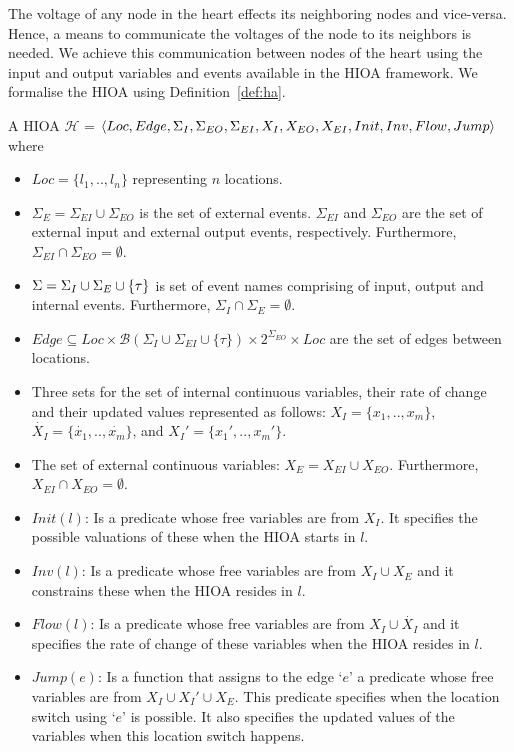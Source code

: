 The voltage of any node in the heart effects its neighboring nodes and
vice-versa. Hence, a means to communicate the voltages of the node to
its neighbors is needed. We achieve this communication between nodes of
the heart using the input and output variables and events available in
the \ac{HIOA} framework. We formalise the \ac{HIOA} using
Definition~\ref{def:ha}.


\begin{definition}
  A \acf{HIOA} \newline $\mathcal{H}$ =
  $\langle Loc, Edge, \Sigma_I, \Sigma_{EO}, \Sigma_{EI}, X_I, X_{EO},
  X_{EI}, \linebreak Init, Inv, Flow, Jump\rangle$ where
  \begin{itemize}
  \item $Loc=\{l_1,..,l_n\}$ representing $n$ locations.
  \item $\Sigma_{E} = \Sigma_{EI} \cup \Sigma_{EO}$ is the set of
    external events. $\Sigma_{EI}$ and $\Sigma_{EO}$ are the set of
    external input and external output events,
    respectively. Furthermore,
    \mbox{$\Sigma_{EI} \cap \Sigma_{EO} = \emptyset$}.
  \item $\Sigma=\Sigma_I \cup \Sigma_{E} \cup \{\tau\}$ is set of
    event names comprising of input, output and internal
    events. Furthermore, \mbox{$\Sigma_I \cap \Sigma_E = \emptyset$}.
  \item
    $Edge \subseteq Loc \times \mathcal{B}(\Sigma_I \cup \Sigma_{EI}
    \cup \{\tau\}) \times 2^{\Sigma_{EO}} \times Loc$
    are the set of edges between locations.
  \item Three sets for the set of internal continuous variables, their
    rate of change and their updated values represented as follows:
    $X_I=\{x_1,.., x_m\}$, $\dot{X_I}=\{\dot{x_1},.., \dot{x_m}\}$, and
    $X_I'=\{x_{1}',.., x_{m}'\}$.
  \item The set of external continuous variables:
    \mbox{$X_E = X_{EI} \cup X_{EO}$}. Furthermore,
    \mbox{$X_{EI} \cap X_{EO} = \emptyset$}.
  \item $Init(l)$: Is a predicate whose free variables are from
    $X_{I}$. It specifies the possible valuations of these when the HIOA
    starts in $l$.
  \item $Inv(l)$: Is a predicate whose free variables are from
    \mbox{$X_I \cup X_{E}$} and it constrains these when the HIOA
    resides in $l$.
  \item $Flow(l)$: Is a predicate whose free variables are from
    $X_I \cup \dot{X_I}$ and it specifies the rate of change of these
    variables when the HIOA resides in $l$.
  \item $Jump(e)$: Is a function that assigns to the edge `$e$' a
    predicate whose free variables are from $X_I \cup X_I' \cup X_E$.
    This predicate specifies when the location switch using `$e$' is
    possible. It also specifies the updated values of the variables when
    this location switch happens.
  \end{itemize}
  \label{def:ha}
\end{definition}

